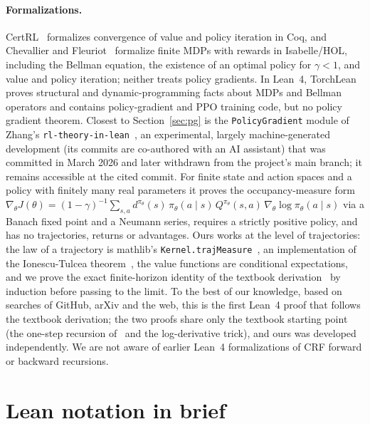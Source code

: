 \documentclass[11pt,a4paper]{article}
\newcommand{\grad}{\nabla_{\theta}}
\begin{document}
\paragraph{Formalizations.}
CertRL~\cite{vajjha2021certrl} formalizes convergence of value and policy iteration in Coq, and Chevallier and Fleuriot~\cite{chevallier2021isabelle} formalize finite MDPs with rewards in Isabelle/HOL, including the Bellman equation, the existence of an optimal policy for $\gamma<1$, and value and policy iteration; neither treats policy gradients.
In Lean~4, TorchLean~\cite{torchlean} proves structural and dynamic-programming facts about MDPs and Bellman operators and contains policy-gradient and PPO training code, but no policy gradient theorem.
Closest to Section~\ref{sec:pg} is the \texttt{PolicyGradient} module of Zhang's \texttt{rl-theory-in-lean}~\cite{zhang2026pg}, an experimental, largely machine-generated development (its commits are co-authored with an AI assistant) that was committed in March 2026 and later withdrawn from the project's main branch; it remains accessible at the cited commit.
For finite state and action spaces and a policy with finitely many real parameters it proves the occupancy-measure form
$\grad J(\theta)=(1-\gamma)^{-1}\sum_{s,a}d^{\pi_\theta}(s)\,\pi_\theta(a\mid s)\,Q^{\pi_\theta}(s,a)\,\grad\log\pi_\theta(a\mid s)$
via a Banach fixed point and a Neumann series, requires a strictly positive policy, and has no trajectories, returns or advantages.
Ours works at the level of trajectories: the law of a trajectory is mathlib's \texttt{Kernel.trajMeasure}~\cite{mathlib}, an implementation of the Ionescu-Tulcea theorem~\cite{kallenberg2002foundations}, the value functions are conditional expectations, and we prove the exact finite-horizon identity of the textbook derivation~\cite[\S13.2]{sutton2018reinforcement} by induction before passing to the limit.
To the best of our knowledge, based on searches of GitHub, arXiv and the web, this is the first Lean~4 proof that follows the textbook derivation; the two proofs share only the textbook starting point (the one-step recursion of~\cite{sutton2000policy} and the log-derivative trick), and ours was developed independently.
We are not aware of earlier Lean~4 formalizations of CRF forward or backward recursions.

\section{Lean notation in brief}
\label{sec:notation}
\end{document}
